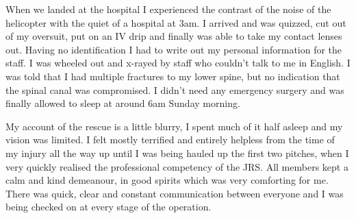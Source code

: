     When we landed at the hospital I experienced the contrast of the noise of the helicopter with the quiet of a hospital at 3am. I arrived and was quizzed, cut out of my oversuit, put on an IV drip and finally was able to take my contact lenses out. Having no identification I had to write out my personal information for the staff. I was wheeled out and x-rayed by staff who couldn’t talk to me in English. I was told that I had multiple fractures to my lower spine, but no indication that the spinal canal was compromised. I didn’t need any emergency surgery and was finally allowed to sleep at around 6am Sunday morning.

    My account of the rescue is a little blurry, I spent much of it half asleep and my vision was limited. I felt mostly terrified and entirely helpless from the time of my injury all the way up until I was being hauled up the first two pitches, when I very quickly realised the professional competency of the JRS. All members kept a calm and kind demeanour, in good spirits which was very comforting for me. There was quick, clear and constant communication between everyone and I was being checked on at every stage of the operation.

